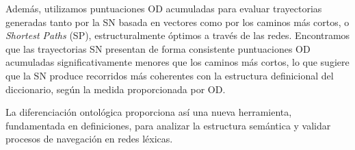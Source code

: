 \documentclass[11pt,a4paper]{article}
\begin{document}
\begin{sincabstract}
Además, utilizamos puntuaciones OD acumuladas para evaluar trayectorias generadas tanto por la SN basada en vectores como por los caminos más cortos, o \textit{Shortest Paths} (SP), estructuralmente óptimos a través de las redes. Encontramos que las trayectorias SN presentan de forma consistente puntuaciones OD acumuladas significativamente menores que los caminos más cortos, lo que sugiere que la SN produce recorridos más coherentes con la estructura definicional del diccionario, según la medida proporcionada por OD.

La diferenciación ontológica proporciona así una nueva herramienta, fundamentada en definiciones, para analizar la estructura semántica y validar procesos de navegación en redes léxicas.


\end{sincabstract}




\end{document}
